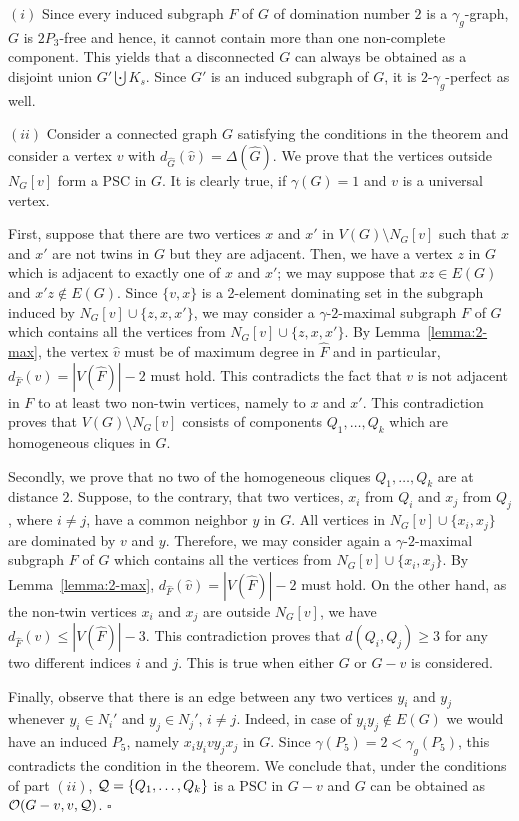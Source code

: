 \documentclass[12pt]{article}
\newcommand{\proof}{\noindent{\bf Proof.\ }}
\newcommand{\qed}{\hfill $\square$ \bigskip}
\newcommand{\cO}{{\cal O}}
\newcommand{\cQ}{{\cal Q}}
\begin{document}
\proof $(i)$ Since every induced subgraph $F$ of $G$ of domination number $2$ is a $\gamma_g$-graph, $G$ is $2P_3$-free and hence, it cannot contain more than one non-complete component. This yields that a disconnected  $G$ can always be obtained as a disjoint union $G' \bigcupdot  K_s$. Since $G'$ is an induced subgraph of $G$, it is $2$-$\gamma_g$-perfect as well.

$(ii)$ Consider a connected graph $G$ satisfying the conditions in the theorem and consider a vertex $v$ with $d_{\widehat{G}}(\widehat{v})=\Delta(\widehat{G})$. We prove that the vertices outside $N_G[v]$ form a PSC in $G$. It is clearly true, if $\gamma(G)=1$ and $v$ is a universal vertex.

First, suppose that there are two vertices $x$ and $x'$ in $V(G)\setminus N_G[v]$ such that $x$ and $x'$ are not twins in $G$ but they are adjacent. Then, we have a vertex $z$ in $G$ which is adjacent to exactly one of $x$ and $x'$; we may suppose that $xz \in E(G)$ and $x'z \notin E(G)$. Since $\{v,x\}$ is a 2-element dominating set in the subgraph induced by $N_G[v] \cup \{z,x,x'\}$, we may consider a $\gamma$-$2$-maximal subgraph $F$ of $G$ which contains all the vertices from  $N_G[v] \cup \{z,x,x'\}$. By Lemma~\ref{lemma:2-max}, the vertex $\widehat{v}$ must be of maximum degree in $\widehat{F}$ and in particular, $d_{\widehat{F}}(\widehat{v}) = |V(\widehat{F})|-2$ must hold. This contradicts the fact that $v$ is not adjacent in $F$ to at least two non-twin vertices, namely to $x$ and $x'$. This contradiction proves that $V(G)\setminus N_G[v]$ consists of components $Q_1, \dots, Q_k$ which are homogeneous cliques in $G$.

Secondly, we prove that no two of the homogeneous cliques $Q_1, \dots, Q_k$ are at distance $2$. Suppose, to the contrary, that two vertices, $x_i$ from $Q_i$ and $x_j$ from $Q_j$, where $i\neq j$, have a common neighbor $y$ in $G$. All vertices in $N_G[v] \cup \{x_i, x_j\}$ are dominated by $v$ and $y$. Therefore, we may consider again a $\gamma$-$2$-maximal subgraph $F$ of $G$ which contains all the vertices from  $N_G[v] \cup \{x_i,x_j\}$. By Lemma~\ref{lemma:2-max},  $d_{\widehat{F}}(\widehat{v}) = |V(\widehat{F})|-2$ must hold. On the other hand, as the non-twin vertices $x_i$ and $x_j$ are outside $N_G[v]$, we have $d_{\widehat{F}}(\widehat{v}) \le |V(\widehat{F})|-3$. This contradiction proves that $d(Q_i, Q_j) \ge 3$ for any two different indices $i$ and $j$. This is true when either $G$ or $G-v$ is considered.

Finally, observe that there is an edge between any two vertices $y_i$ and $y_j$ whenever  $y_i \in N_i'$ and $y_j \in N_j'$, $i\neq j$. Indeed, in case of  $y_iy_j \notin E(G)$ we would have an induced $P_5$, namely  $x_iy_ivy_jx_j$ in $G$. Since $\gamma(P_5)=2 <\gamma_g(P_5)$, this contradicts the condition in the theorem. We conclude that, under the conditions of part $(ii)$,  $\cQ=\{Q_1,\dots , Q_k\}$ is a PSC in $G-v$ and $G$ can be obtained as $\cO(G-v, v, \cQ)$. \qed
\end{document}
